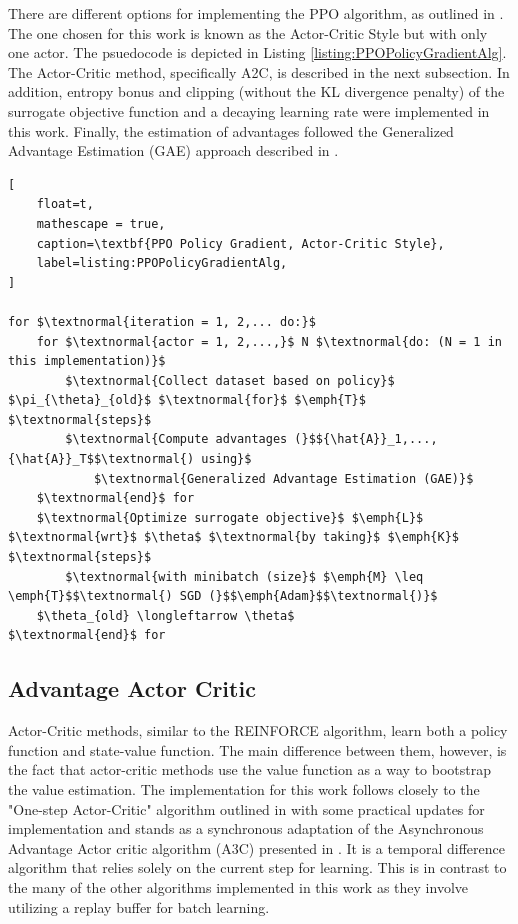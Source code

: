 \documentclass[conference]{IEEEtran}
\begin{document}
There are different options for implementing the PPO algorithm, as outlined in \cite{schulman2017proximal}. The one chosen for this work is known as the Actor-Critic Style but with only one actor. The psuedocode is depicted in Listing \ref{listing:PPOPolicyGradientAlg}. The Actor-Critic method, specifically A2C, is described in the next subsection. In addition, entropy bonus and clipping (without the KL divergence penalty) of the surrogate objective function and a decaying learning rate were implemented in this work. Finally, the estimation of advantages followed the Generalized Advantage Estimation (GAE) approach described in \cite{schulman2018highdimensional}.

\begin{lstlisting}[
    float=t,
    mathescape = true,
    caption=\textbf{PPO Policy Gradient, Actor-Critic Style},
    label=listing:PPOPolicyGradientAlg,
]

for $\textnormal{iteration = 1, 2,... do:}$
    for $\textnormal{actor = 1, 2,...,}$ N $\textnormal{do: (N = 1 in this implementation)}$
        $\textnormal{Collect dataset based on policy}$ $\pi_{\theta}_{old}$ $\textnormal{for}$ $\emph{T}$ $\textnormal{steps}$
        $\textnormal{Compute advantages (}$${\hat{A}}_1,..., {\hat{A}}_T$$\textnormal{) using}$
            $\textnormal{Generalized Advantage Estimation (GAE)}$
    $\textnormal{end}$ for
    $\textnormal{Optimize surrogate objective}$ $\emph{L}$ $\textnormal{wrt}$ $\theta$ $\textnormal{by taking}$ $\emph{K}$ $\textnormal{steps}$
        $\textnormal{with minibatch (size}$ $\emph{M} \leq \emph{T}$$\textnormal{) SGD (}$$\emph{Adam}$$\textnormal{)}$
    $\theta_{old} \longleftarrow \theta$
$\textnormal{end}$ for

\end{lstlisting}

\subsection{Advantage Actor Critic}
Actor-Critic methods, similar to the REINFORCE algorithm, learn both a policy function and state-value function.
The main difference between them, however, is the fact that actor-critic methods use the value function as a way to bootstrap the value estimation.
The implementation for this work follows closely to the "One-step Actor-Critic" algorithm outlined in \cite{ReinforcementLearningBook} with some practical updates for implementation and stands as a synchronous adaptation of the Asynchronous Advantage Actor critic algorithm (A3C) presented in \cite{mnih2016asynchronous}.
It is a temporal difference algorithm that relies solely on the current step for learning.
This is in contrast to the many of the other algorithms implemented in this work as they involve utilizing a replay buffer for batch learning.
\end{document}
